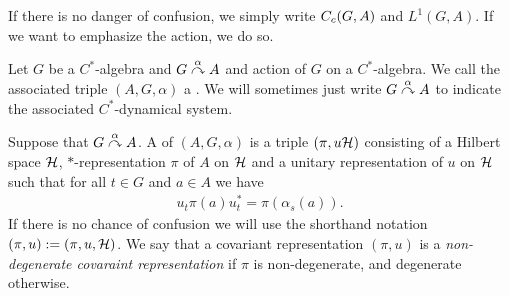 \begin{remark}
	If there is no danger of confusion, we simply write $C_c(G,A)$ and $L^1(G,A)$. If we want to emphasize the action, we do so.
\end{remark}
\begin{definition}
	Let $G$ be a $C^*$-algebra and $G \stackrel{\alpha}{\curvearrowright} A$ and action of $G$ on a $C^*$-algebra. We call the associated triple $(A,G,\alpha)$ a . We will sometimes just write $G \stackrel{\alpha}{\curvearrowright} A$ to indicate the associated $C^*$-dynamical system.
\end{definition}
\begin{definition}
	Suppose that $G \stackrel{\alpha}{\curvearrowright} A$. A  of $(A,G,\alpha)$ is a triple $(\pi,u\mathcal{H})$ consisting of a Hilbert space $\mathcal{H}$, $*$-representation $\pi$ of $A$ on $\mathcal{H}$ and a unitary representation of $u$ on $\mathcal{H}$ such that for all $t \in G$ and $a \in A$ we have
	\begin{align*}
		u_t \pi(a) u_t^* = \pi(\alpha_s(a)).
	\end{align*}
	If there is no chance of confusion we will use the shorthand notation $(\pi,u):= (\pi,u,\mathcal{H})$. We say that a covariant representation $(\pi,u)$ is a \textit{non-degenerate covaraint representation} if $\pi$ is non-degenerate, and degenerate otherwise.
\end{definition}

